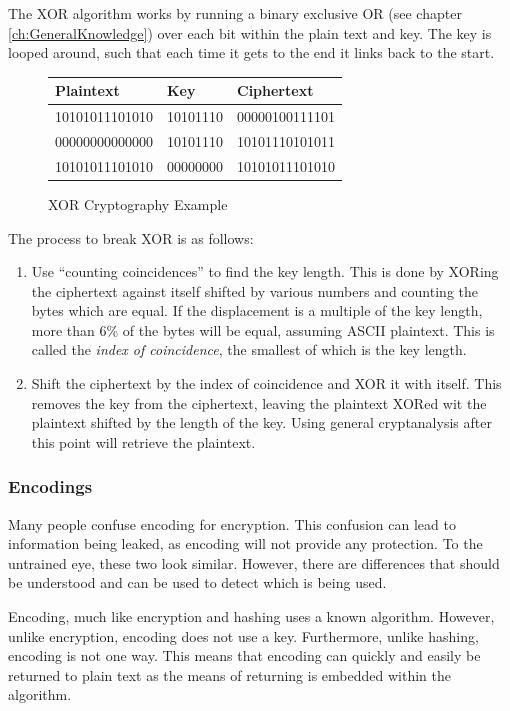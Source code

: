 				The XOR algorithm works by running a binary exclusive OR (see chapter \ref{ch:GeneralKnowledge}) 
				over each bit within the plain text and key. 
				The key is looped around, such that each time it gets to the end it links back to the start. 

				\begin{figure}[htb]
					\centering
					\begin{tabular}{| l | l | l |}
						\hline
						\textbf{Plaintext} & \textbf{Key} & \textbf{Ciphertext} \\ \hline
						10101011101010 & 10101110 & 00000100111101 \\ \hline
						00000000000000 & 10101110 & 10101110101011 \\ \hline
						10101011101010 & 00000000 & 10101011101010 \\ \hline
					\end{tabular}
					\caption{XOR Cryptography Example}
					\label{fig:XORExample}
				\end{figure}
				The process to break XOR is as follows:
				\begin{enumerate}
					\item Use ``counting coincidences'' to find the key length. 
						This is done by XORing the ciphertext against itself shifted by various numbers and counting the bytes which are equal. 
						If the displacement is a multiple of the key length, more than 6\% of the bytes will be equal, assuming ASCII plaintext. 
						This is called the \emph{index of coincidence}, the smallest of which is the key length. 
					\item Shift the ciphertext by the index of coincidence and XOR it with itself. 
						This removes the key from the ciphertext, leaving the plaintext XORed wit the plaintext shifted by the length of the key. 
						Using general cryptanalysis after this point will retrieve the plaintext. 
				\end{enumerate}

			\subsubsection{Encodings}
				Many people confuse encoding for encryption. 
				This confusion can lead to information being leaked, as encoding will not provide any protection. 
				To the untrained eye, these two look similar. 
				However, there are differences that should be understood and can be used to detect which is being used. 

				Encoding, much like encryption and hashing uses a known algorithm. 
				However, unlike encryption, encoding does not use a key. 
				Furthermore, unlike hashing, encoding is not one way. 
				This means that encoding can quickly and easily be returned to plain text as the means of returning is embedded within the algorithm.

